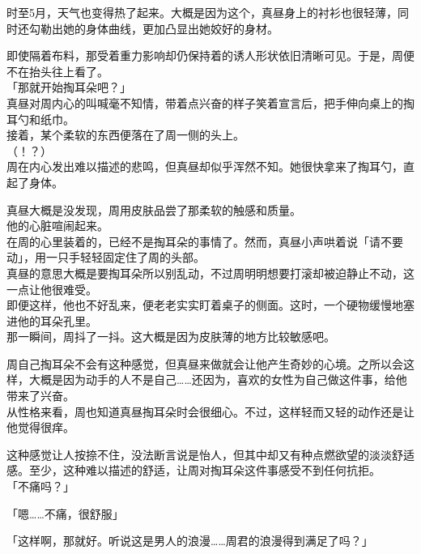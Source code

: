 时至5月，天气也变得热了起来。大概是因为这个，真昼身上的衬衫也很轻薄，同时还勾勒出她的身体曲线，更加凸显出她姣好的身材。

即使隔着布料，那受着重力影响却仍保持着的诱人形状依旧清晰可见。于是，周便不在抬头往上看了。\\

「那就开始掏耳朵吧？」\\

真昼对周内心的叫喊毫不知情，带着点兴奋的样子笑着宣言后，把手伸向桌上的掏耳勺和纸巾。\\

接着，某个柔软的东西便落在了周一侧的头上。\\

（！？）\\

周在内心发出难以描述的悲鸣，但真昼却似乎浑然不知。她很快拿来了掏耳勺，直起了身体。

真昼大概是没发现，周用皮肤品尝了那柔软的触感和质量。\\

他的心脏喧闹起来。\\

在周的心里装着的，已经不是掏耳朵的事情了。然而，真昼小声哄着说「请不要动」，用一只手轻轻固定住了周的头部。\\

真昼的意思大概是要掏耳朵所以别乱动，不过周明明想要打滚却被迫静止不动，这一点让他很难受。\\

即便这样，他也不好乱来，便老老实实盯着桌子的侧面。这时，一个硬物缓慢地塞进他的耳朵孔里。\\

那一瞬间，周抖了一抖。这大概是因为皮肤薄的地方比较敏感吧。

周自己掏耳朵不会有这种感觉，但真昼来做就会让他产生奇妙的心境。之所以会这样，大概是因为动手的人不是自己……还因为，喜欢的女性为自己做这件事，给他带来了兴奋。\\

从性格来看，周也知道真昼掏耳朵时会很细心。不过，这样轻而又轻的动作还是让他觉得很痒。

这种感觉让人按捺不住，没法断言说是怡人，但其中却又有种点燃欲望的淡淡舒适感。至少，这种难以描述的舒适，让周对掏耳朵这件事感受不到任何抗拒。\\

「不痛吗？」

「嗯……不痛，很舒服」

「这样啊，那就好。听说这是男人的浪漫……周君的浪漫得到满足了吗？」

